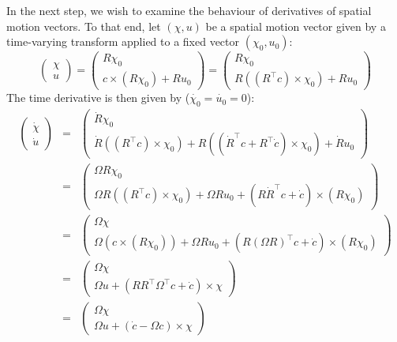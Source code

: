 \documentclass[a4paper]{article}
\begin{document}
In the next step, we wish to examine the behaviour of derivatives of spatial motion vectors. To that end, let $(\chi, u)$ be a spatial motion vector given by a time-varying transform applied to a fixed vector $(\chi_0, u_0)$:
\begin{equation}
\left(\begin{array}{c}\chi\\u\end{array}\right) = 
\left(\begin{array}{c}
R \chi_0\\
c \times (R \chi_0) + R u_0
\end{array}\right)
=\left(\begin{array}{c}
R \chi_0\\
R((R^\top c) \times \chi_0) + R u_0
\end{array}\right)
\end{equation}
The time derivative is then given by ($\dot{\chi_0} = \dot{u_0} = 0$):
\begin{eqnarray}
\left(\begin{array}{c} \dot{\chi} \\ \dot{u} \end{array}\right) &=&
\left(\begin{array}{c} \dot{R} \chi_0 \\ \dot{R}((R^\top c) \times \chi_0) + R((\dot{R}^\top c + R^\top \dot{c}) \times \chi_0) + \dot{R}u_0 \end{array}\right)\\
&=& \left(\begin{array}{c}\Omega R \chi_0\\ \Omega R ((R^\top c) \times \chi_0) + \Omega R u_0 + (R \dot{R}^\top c + \dot{c}) \times (R \chi_0)\end{array}\right)\\
&=& \left(\begin{array}{c}\Omega \chi\\ \Omega (c \times (R \chi_0)) + \Omega R u_0 + (R (\Omega R)^\top c + \dot{c}) \times (R \chi_0)\end{array}\right)\\
&=& \left(\begin{array}{c} \Omega \chi\\ \Omega u + (R R^\top \Omega^\top c + \dot{c}) \times \chi\end{array}\right)\\
&=& \left(\begin{array}{c} \Omega \chi\\ \Omega u + (\dot{c} - \Omega c) \times \chi \end{array}\right)
\end{eqnarray}
\end{document}
